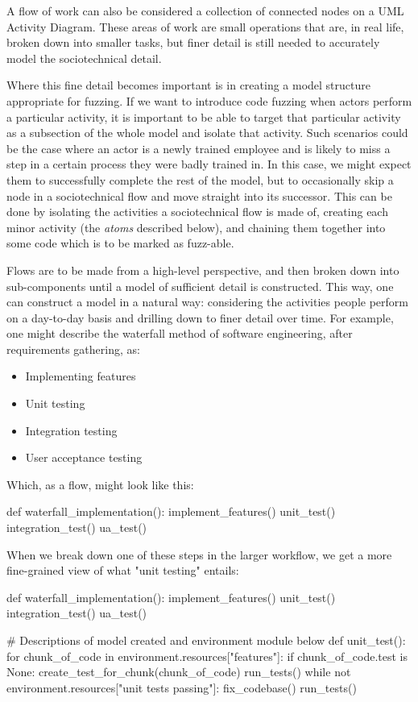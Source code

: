 A flow of work can also be considered a collection of connected nodes on a UML Activity Diagram. These areas of work are small operations that are, in real life, broken down into smaller tasks, but finer detail is still needed to accurately model the sociotechnical detail\cite{Crabtree2000}. \par

Where this fine detail becomes important is in creating a model structure appropriate for fuzzing. If we want to introduce code fuzzing when actors perform a particular activity, it is important to be able to target that particular activity as a subsection of the whole model and isolate that activity. Such scenarios could be the case where an actor is a newly trained employee and is likely to miss a step in a certain process they were badly trained in. In this case, we might expect them to successfully complete the rest of the model, but to occasionally skip a node in a sociotechnical flow and move straight into its successor. This can be done by isolating the activities a sociotechnical flow is made of, creating each minor activity (the \emph{atoms} described below), and chaining them together into some code which is to be marked as fuzz-able.\par

Flows are to be made from a high-level perspective, and then broken down into sub-components until a model of sufficient detail is constructed. This way, one can construct a model in a natural way: considering the activities people perform on a day-to-day basis and drilling down to finer detail over time. For example, one might describe the waterfall method of software engineering, after requirements gathering, as: 
\begin{itemize}
    \item Implementing features
    \item Unit testing
    \item Integration testing
    \item User acceptance testing
\end{itemize} \par
Which, as a flow, might look like this:
\begin{pyglist}[language = python, encoding = utf8]
def waterfall_implementation():
    implement_features()
    unit_test()
    integration_test()
    ua_test()
\end{pyglist}

When we break down one of these steps in the larger workflow, we get a more fine-grained view of what "unit testing" entails:
\begin{pyglist}[language = python, encoding = utf8]
def waterfall_implementation():
    implement_features()
    unit_test()
    integration_test()
    ua_test()

# Descriptions of model created and environment module below
def unit_test():
    for chunk_of_code in environment.resources["features"]:
        if chunk_of_code.test is None:
            create_test_for_chunk(chunk_of_code)
    run_tests()
    while not environment.resources["unit tests passing"]:
        fix_codebase()
        run_tests()
\end{pyglist}

